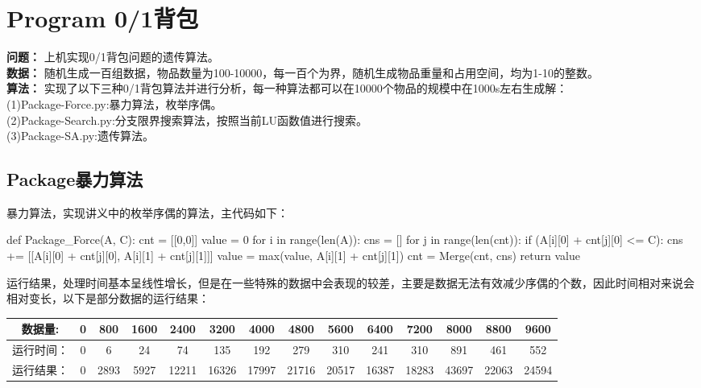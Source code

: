 \documentclass[paper=a4,margin=0.5cm]{scrartcl} %
\begin{document}


\section{Program 0/1背包}


\indent \textbf{问题：} 上机实现0/1背包问题的遗传算法。\\
\indent \textbf{数据：} 随机生成一百组数据，物品数量为100-10000，每一百个为界，随机生成物品重量和占用空间，均为1-10的整数。\\
\indent \textbf{算法：} 实现了以下三种0/1背包算法并进行分析，每一种算法都可以在10000个物品的规模中在1000s左右生成解：\\
\indent (1)Package-Force.py:暴力算法，枚举序偶。\\
\indent (2)Package-Search.py:分支限界搜索算法，按照当前LU函数值进行搜索。\\
\indent (3)Package-SA.py:遗传算法。\\

\subsection{Package暴力算法}

\indent 暴力算法，实现讲义中的枚举序偶的算法，主代码如下：\\
\begin{python}
def Package_Force(A, C):
	cnt = [[0,0]]
	value = 0
	for i in range(len(A)):
		cns = []
		for j in range(len(cnt)):
			if (A[i][0] + cnt[j][0] <= C):
				cns += [[A[i][0] + cnt[j][0], A[i][1] + cnt[j][1]]]
				value = max(value, A[i][1] + cnt[j][1])
		cnt = Merge(cnt, cns)
return value
\end{python}

\indent 运行结果，处理时间基本呈线性增长，但是在一些特殊的数据中会表现的较差，主要是数据无法有效减少序偶的个数，因此时间相对来说会相对变长，以下是部分数据的运行结果：\\
\begin{tabular}{cccccccccccccc}
	\hline 
	数据量: & 0 & 800 & 1600 & 2400 & 3200 & 4000 & 4800 & 5600 & 6400 & 7200 & 8000 & 8800 & 9600\\ 
	\hline 
	运行时间：& 0 & 6 & 24 & 74 & 135 & 192 & 279 & 310 & 241 & 310 & 891 & 461 & 552 \\ 
	\hline 
	运行结果：& 0 & 2893 & 5927 & 12211 & 16326 & 17997 & 21716 & 20517 & 16387 & 18283 & 43697 & 22063 & 24594\\ 
	\hline 
\end{tabular}
\end{document}
